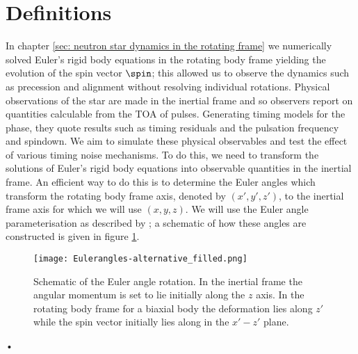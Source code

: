 \documentclass[/home/greg/Thesis/main/main.tex]{subfiles}
\begin{document}
\graphicspath{{/home/greg/Neutron_star_modelling/TimingNoiseModels/InertialSpaceResults/img/}}

\newcommand{\Jr}{\mathbf{J}_{\textrm{rot}}}
\newcommand{\Ji}{\mathbf{J}_{\textrm{in}}}

\section{Definitions}
In chapter \ref{sec: neutron star dynamics in the rotating frame} we
numerically solved Euler's rigid body equations in the rotating body frame
yielding the evolution of the spin vector $\spin$; this allowed us to observe
the dynamics such as precession and alignment without resolving individual
rotations. Physical observations of the star are made in the inertial frame and
so observers report on quantities calculable from the TOA of pulses. Generating
timing models for the phase, they quote results such as timing residuals and
the pulsation frequency and spindown. We aim to simulate these physical
observables and test the effect of various timing noise mechanisms. To do
this, we need to transform the solutions of Euler's rigid body equations into
observable quantities in the inertial frame. An efficient way to do this is to
determine the Euler angles which transform the rotating body frame axis,
denoted by $(x',y', z')$, to the inertial frame axis for which we will use $(x,
y, z)$. We will use the Euler angle parameterisation as described by
\citet{Landau1969}; a schematic of how these angles are constructed is given in
figure \ref{fig: Euler}. 
\begin{figure}[ht]
\centering
\texttt{[image: Eulerangles-alternative\_filled.png]}
\caption{Schematic of the Euler angle rotation. In the inertial frame the
angular momentum is set to lie initially along the $z$ axis. In the rotating
body frame for a biaxial body the deformation lies along $z'$ while the spin
vector initially lies along in the $x'- z'$ plane.}
\label{fig: Euler}
\end{figure}•
\end{document}
